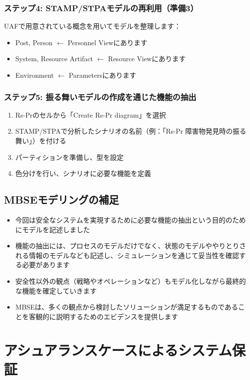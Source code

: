 \subsubsection{ステップ4: STAMP/STPAモデルの再利用（準備3）}
UAFで用意されている概念を用いてモデルを整理します：
\begin{itemize}
    \item Post, Person $\leftarrow$ Personnel Viewにあります
    \item System, Resource Artifact $\leftarrow$ Resource Viewにあります
    \item Environment $\leftarrow$ Parametersにあります
\end{itemize}

\subsubsection{ステップ5: 振る舞いモデルの作成を通じた機能の抽出}
\begin{enumerate}
    \item Rs-Prのセルから「Create Rs-Pr diagram」を選択
    \item STAMP/STPAで分析したシナリオの名前（例：「Rs-Pr 障害物発見時の振る舞い」）を付ける
    \item パーティションを準備し、型を設定
    \item 色分けを行い、シナリオに必要な機能を定義
\end{enumerate}

\subsection{MBSEモデリングの補足}
\begin{itemize}
    \item 今回は安全なシステムを実現するために必要な機能の抽出という目的のためにモデルを記述しました
    \item 機能の抽出には、プロセスのモデルだけでなく、状態のモデルややりとりされる情報のモデルなども記述し、シミュレーションを通じて妥当性を確認する必要があります
    \item 安全性以外の観点（戦略やオペレーションなど）もモデル化しながら最終的な機能を確定していきます
    \item MBSEは、多くの観点から検討したソリューションが満足するものであることを客観的に説明するためのエビデンスを提供します
\end{itemize}

\section{アシュアランスケースによるシステム保証}

